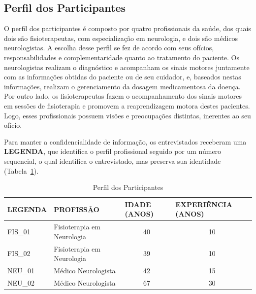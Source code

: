 \subsection{Perfil dos Participantes}
O perfil dos participantes é composto por quatro profissionais da saúde, dos quais dois são fisioterapeutas, com especialização em neurologia, e dois são médicos neurologistas. A escolha desse perfil se fez de acordo com seus ofícios, responsabilidades e complementaridade quanto ao tratamento do paciente. Os neurologistas realizam o diagnóstico e acompanham os sinais motores juntamente com as informações obtidas do paciente ou de seu cuidador, e, baseados nestas informações, realizam o gerenciamento da dosagem medicamentosa da doença. Por outro lado, os fisioterapeutas fazem o acompanhamento dos sinais motores em sessões de fisioterapia e promovem a reaprendizagem motora destes pacientes. Logo, esses profissionais possuem visões e preocupações distintas, inerentes ao seu ofício. 

Para manter a confidencialidade de informação, os entrevistados receberam uma \textbf{LEGENDA}, que identifica o perfil profissional seguido por um número sequencial, o qual identifica o entrevistado, mas preserva sua identidade (Tabela~\ref{table:perfil_analise_participantes}).

\begin{table}[h]
\caption{Perfil dos Participantes}
\label{table:perfil_analise_participantes}
\begin{tabular}{|l|l|c|c|}
\hline
\textbf{LEGENDA} & \textbf{PROFISSÃO}             & \multicolumn{1}{|l}{\textbf{IDADE (ANOS)}} & \multicolumn{1}{|l|}{\textbf{EXPERIÊNCIA (ANOS)}} \\ \hline
FIS\_01          & Fisioterapia em Neurologia & 40                                         & 10                                                \\ \hline
FIS\_02          & Fisioterapia em Neurologia     & 39                                         & 10                                                \\ \hline
NEU\_01          & Médico Neurologista            & 42                                         & 15                                                \\ \hline
NEU\_02          & Médico Neurologista            & 67                                         & 30                                                \\ \hline
\end{tabular}

\end{table}

